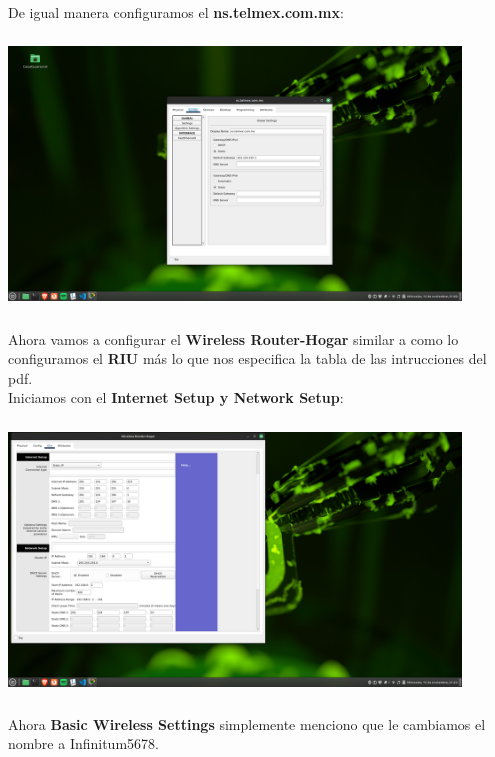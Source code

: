 \documentclass[14pt]{book}
\begin{document}
De igual manera configuramos el \textbf{ns.telmex.com.mx}:\\

\includegraphics[width=12cm, height=8cm]{images/dnstelmex.png}\\

Ahora vamos a configurar el \textbf{Wireless Router-Hogar} similar a como lo configuramos el \textbf{RIU} más lo que nos especifica la tabla de las intrucciones del pdf.\\

Iniciamos con el \textbf{Internet Setup y Network Setup}:\\

\includegraphics[width=12cm, height=8cm]{images/confiwireles.png}\\

Ahora \textbf{Basic Wireless Settings} simplemente menciono que le cambiamos el nombre a \textsf{Infinitum5678}.\\
\end{document}
